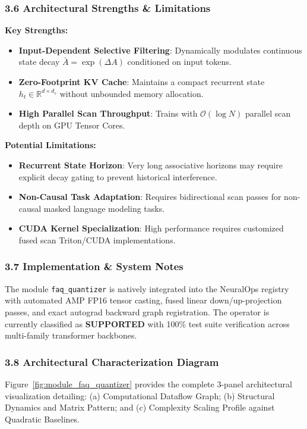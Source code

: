 \subsubsection*{3.6 Architectural Strengths \& Limitations}
\textbf{Key Strengths:}
\begin{itemize}
    \item \textbf{Input-Dependent Selective Filtering}: Dynamically modulates continuous state decay $\bar{A} = \exp(\Delta A)$ conditioned on input tokens.
    \item \textbf{Zero-Footprint KV Cache}: Maintains a compact recurrent state $h_t \in \mathbb{R}^{d \times d_s}$ without unbounded memory allocation.
    \item \textbf{High Parallel Scan Throughput}: Trains with $\mathcal{O}(\log N)$ parallel scan depth on GPU Tensor Cores.
\end{itemize}

\textbf{Potential Limitations:}
\begin{itemize}
    \item \textbf{Recurrent State Horizon}: Very long associative horizons may require explicit decay gating to prevent historical interference.
    \item \textbf{Non-Causal Task Adaptation}: Requires bidirectional scan passes for non-causal masked language modeling tasks.
    \item \textbf{CUDA Kernel Specialization}: High performance requires customized fused scan Triton/CUDA implementations.
\end{itemize}

\subsubsection*{3.7 Implementation \& System Notes}
The module \texttt{faq\_quantizer} is natively integrated into the NeuralOps registry with automated AMP FP16 tensor casting, fused linear down/up-projection passes, and exact autograd backward graph registration. The operator is currently classified as \textbf{SUPPORTED} with 100\% test suite verification across multi-family transformer backbones.

\subsubsection*{3.8 Architectural Characterization Diagram}
Figure~\ref{fig:module_faq_quantizer} provides the complete 3-panel architectural visualization detailing: (a) Computational Dataflow Graph; (b) Structural Dynamics and Matrix Pattern; and (c) Complexity Scaling Profile against Quadratic Baselines.

